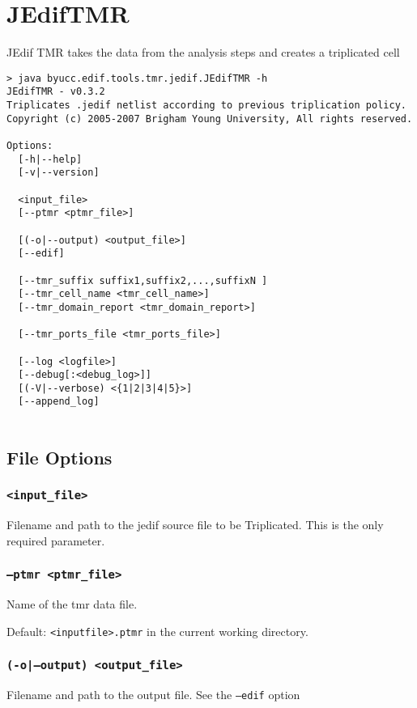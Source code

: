 
\section{JEdifTMR}
JEdif TMR takes the data from the analysis steps and creates a 
triplicated cell

\begin{verbatim}
> java byucc.edif.tools.tmr.jedif.JEdifTMR -h
JEdifTMR - v0.3.2
Triplicates .jedif netlist according to previous triplication policy.
Copyright (c) 2005-2007 Brigham Young University, All rights reserved.

Options:
  [-h|--help]
  [-v|--version]

  <input_file>
  [--ptmr <ptmr_file>]

  [(-o|--output) <output_file>]
  [--edif]

  [--tmr_suffix suffix1,suffix2,...,suffixN ]
  [--tmr_cell_name <tmr_cell_name>]
  [--tmr_domain_report <tmr_domain_report>]

  [--tmr_ports_file <tmr_ports_file>]

  [--log <logfile>]
  [--debug[:<debug_log>]]
  [(-V|--verbose) <{1|2|3|4|5}>]
  [--append_log]


\end{verbatim}

\subsection{File Options}

\subsubsection{\texttt{<input\_file>}}
Filename and path to the jedif source file to be
Triplicated. This is the only required parameter.

\subsubsection{\texttt{--ptmr <ptmr\_file>}}
Name of the tmr data file. 

Default: \texttt{<inputfile>.ptmr} in the current working directory.

\subsubsection{\texttt{(-o|--output) <output\_file>}}
Filename and path to the output file. See the \texttt{--edif}
option

